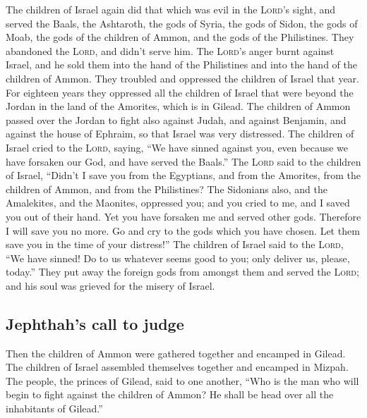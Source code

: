  The children of Israel again did that which was evil in
the \textsc{Lord}'s sight, and served the Baals, the Ashtaroth, the gods
of Syria, the gods of Sidon, the gods of Moab, the gods of the children
of Ammon, and the gods of the Philistines. They abandoned the
\textsc{Lord}, and didn't serve him.  The \textsc{Lord}'s
anger burnt against Israel, and he sold them into the hand of the
Philistines and into the hand of the children of Ammon. 
They troubled and oppressed the children of Israel that year. For
eighteen years they oppressed all the children of Israel that were
beyond the Jordan in the land of the Amorites, which is in Gilead.
 The children of Ammon passed over the Jordan to fight
also against Judah, and against Benjamin, and against the house of
Ephraim, so that Israel was very distressed.  The
children of Israel cried to the \textsc{Lord}, saying, ``We have sinned
against you, even because we have forsaken our God, and have served the
Baals.''  The \textsc{Lord} said to the children of
Israel, ``Didn't I save you from the Egyptians, and from the Amorites,
from the children of Ammon, and from the Philistines? 
The Sidonians also, and the Amalekites, and the Maonites, oppressed you;
and you cried to me, and I saved you out of their hand. 
Yet you have forsaken me and served other gods. Therefore I will save
you no more.  Go and cry to the gods which you have
chosen. Let them save you in the time of your distress!''
 The children of Israel said to the \textsc{Lord}, ``We
have sinned! Do to us whatever seems good to you; only deliver us,
please, today.''  They put away the foreign gods from
amongst them and served the \textsc{Lord}; and his soul was grieved for
the misery of Israel.

\hypertarget{jephthahs-call-to-judge}{%
\subsection{Jephthah's call to judge}\label{jephthahs-call-to-judge}}

 Then the children of Ammon were gathered together and
encamped in Gilead. The children of Israel assembled themselves together
and encamped in Mizpah.  The people, the princes of
Gilead, said to one another, ``Who is the man who will begin to fight
against the children of Ammon? He shall be head over all the inhabitants
of Gilead.''

